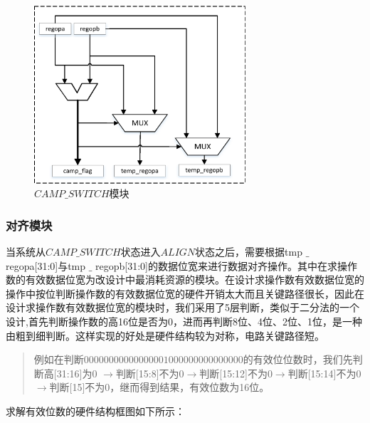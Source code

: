 \documentclass[12pt]{article}
\begin{document}
\begin{figure}[H]
\begin{center}
\includegraphics[width=0.7\textwidth]{./lowpowerdesign/camp_switch.eps}
\caption{$CAMP\_SWITCH$模块}
\label{campswitch}
\end{center}
\end{figure}

\subsubsection{对齐模块}
当系统从$CAMP\_SWITCH$状态进入$ALIGN$状态之后，需要根据tmp $\_$ regopa[31:0]与tmp $\_$ regopb[31:0]的数据位宽来进行数据对齐操作。其中在求操作数的有效数据位宽为改设计中最消耗资源的模块。在设计求操作数有效数据位宽的操作中按位判断操作数的有效数据位宽的硬件开销太大而且关键路径很长，因此在设计求操作数有效数据位宽的模块时，我们采用了5层判断，类似于二分法的一个设计,首先判断操作数的高16位是否为0，进而再判断8位、4位、2位、1位，是一种由粗到细判断。这样实现的好处是硬件结构较为对称，电路关键路径短。

\begin{quote}
例如在判断$00000000000000001000000000000000$的有效位位数时，我们先判断高[31:16]为0 $\to$判断[15:8]不为0$\to$判断[15:12]不为0$\to$判断[15:14]不为0$\to$判断[15]不为0，继而得到结果，有效位数为16位。
\end{quote}

求解有效位数的硬件结构框图如下所示：
\end{document}

